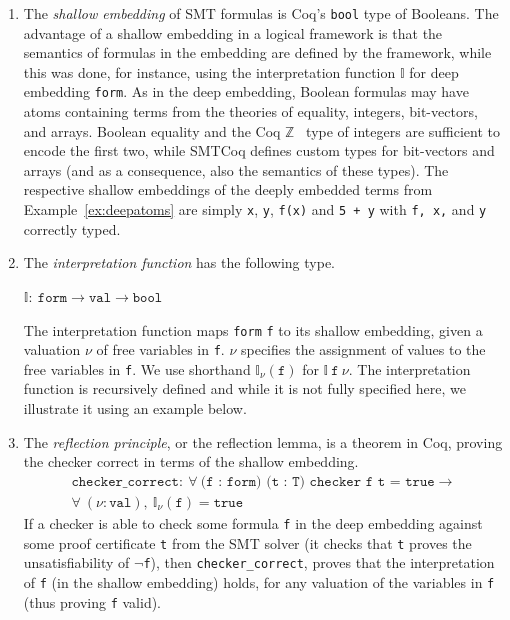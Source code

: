 \documentclass[11pt]{article}
\begin{document}
	\begin{enumerate}
		\item The \emph{shallow 
		embedding} of SMT formulas
		is Coq's \texttt{bool} 
		type of Booleans. The 
		advantage of a shallow 
		embedding in a logical 
		framework is that  the 
		semantics of formulas in 
		the embedding are 
		defined by the framework, 
		while 
		this was done, for 
		instance, using the 
		interpretation function
		$\mathbb{I}$ for deep 
		embedding \texttt{form}.
		As in the deep embedding, 
		Boolean	formulas may have 
		atoms containing terms from 
		the theories of equality, 
		integers, bit-vectors,
		and arrays. Boolean equality 
		and	the Coq 
		$\mathbb{Z}$~\cite{CoqZ} type 
		of integers are sufficient 
		to encode the first two, 
		while SMTCoq defines custom 
		types for bit-vectors and 
		arrays (and as a consequence,
		also the semantics of these
		types). The respective 
		shallow embeddings of
		the deeply embedded terms from 
		Example~\ref{ex:deepatoms} are simply
		\texttt{x}, \texttt{y}, \texttt{f(x)} 
		and \texttt{5 + y} 
		with \texttt{f, x,} and \texttt{y}
		correctly typed. 
	
		\item The \emph{interpretation 
		function} has the following type.
		\begin{center}
			$\mathbb{I} :\ \texttt{form} \to 
			\texttt{val} \to \texttt{bool}$
		\end{center}
		The interpretation function maps 
		\texttt{form} \texttt{f} to 
		its shallow embedding, given 
		a valuation $\nu$ of free 
		variables in \texttt{f}. 
		$\nu$ specifies the assignment 
		of values to the free variables in 
		\texttt{f}. We use shorthand 
		$\mathbb{I}_{\nu}
		(\texttt{f})$ for $\mathbb{I}\ 
		\texttt{f}\ \nu$. The interpretation
		function is recursively defined
		and while it is not fully 
		specified here, we 
		illustrate it using an 
		example below.
	
		\item The \emph{reflection 
		principle}, or the 
		reflection lemma, is a 
		theorem in Coq, proving the 
		checker correct in terms of 
		the shallow embedding.
		\begin{align*}
			\texttt{checker\_correct} :\ 
			\forall\ \texttt{(f : form)
			(t : T) checker f t = true} 
			\to \\
			\forall\ (\nu : \texttt{val}),\ 
			\mathbb{I}_{\nu}(\texttt{f}) = 
			\texttt{true}
		\end{align*}
		If a checker is able to check 
		some formula \texttt{f} in 
		the deep embedding against
		some proof certificate 
		\texttt{t} from 
		the SMT solver (it checks that 
		\texttt{t} proves the 
		unsatisfiability
		of \texttt{$\neg$f}), then 
		\texttt{checker\_correct},
		proves that the 
		interpretation of \texttt{f}
		(in the shallow embedding)
		holds, for any valuation of 
		the variables in \texttt{f} 
		(thus proving \texttt{f} valid). 
	

\end{enumerate}
\end{document}
